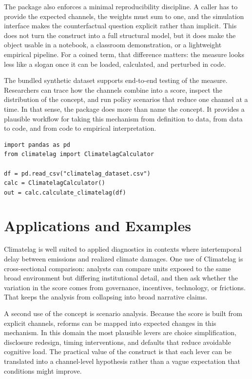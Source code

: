 \documentclass[12pt]{article}
\begin{document}
The package also enforces a minimal reproducibility discipline. A caller has to provide the expected channels, the weights must sum to one, and the simulation interface makes the counterfactual question explicit rather than implicit. This does not turn the construct into a full structural model, but it does make the object usable in a notebook, a classroom demonstration, or a lightweight empirical pipeline. For a coined term, that difference matters: the measure looks less like a slogan once it can be loaded, calculated, and perturbed in code.

The bundled synthetic dataset supports end-to-end testing of the measure. Researchers can trace how the channels combine into a score, inspect the distribution of the concept, and run policy scenarios that reduce one channel at a time. In that sense, the package does more than name the concept. It provides a plausible workflow for taking this mechanism from definition to data, from data to code, and from code to empirical interpretation.

\begin{verbatim}
import pandas as pd
from climatelag import ClimatelagCalculator

df = pd.read_csv("climatelag_dataset.csv")
calc = ClimatelagCalculator()
out = calc.calculate_climatelag(df)
\end{verbatim}

\section{Applications and Examples}
Climatelag is well suited to applied diagnostics in contexts where intertemporal delay between emissions and realized climate damages. One use of Climatelag is cross-sectional comparison: analysts can compare units exposed to the same broad environment but differing institutional detail, and then ask whether the variation in the score comes from governance, incentives, technology, or frictions. That keeps the analysis from collapsing into broad narrative claims.

A second use of the concept is scenario analysis. Because the score is built from explicit channels, reforms can be mapped into expected changes in this mechanism. In this domain the most plausible levers are choice simplification, disclosure redesign, timing interventions, and defaults that reduce avoidable cognitive load. The practical value of the construct is that each lever can be translated into a channel-level hypothesis rather than a vague expectation that conditions might improve.
\end{document}
